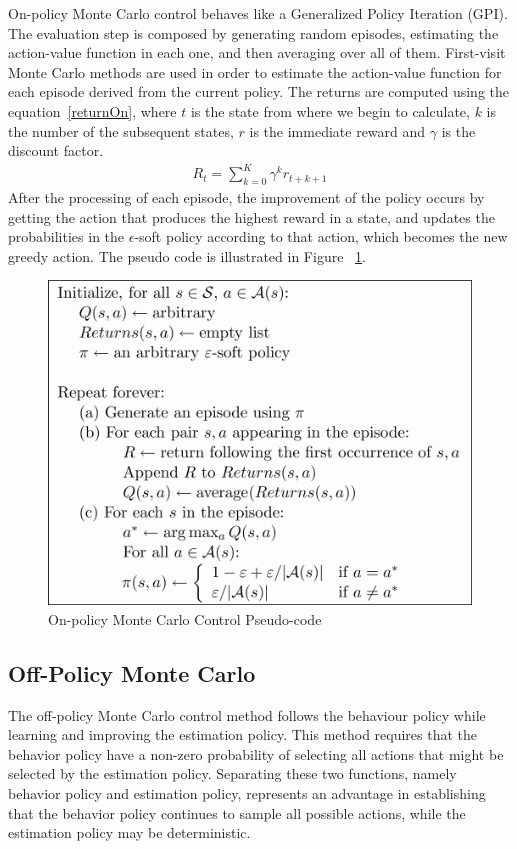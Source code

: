 \documentclass[paper=a4, fontsize=11pt]{scrartcl}
\numberwithin{equation}{section}		%
\numberwithin{figure}{section}			%
\numberwithin{table}{section}				%
\begin{document}
On-policy Monte Carlo control behaves like a Generalized Policy Iteration (GPI). The evaluation step is composed by generating random episodes, estimating the action-value function in each one, and then averaging over all of them. First-visit Monte Carlo methods are used in order to estimate the action-value function for each episode derived from the current policy. The returns are computed using the equation~\ref{returnOn}, where $t$ is the state from where we begin to calculate, $k$ is the number of the subsequent states, $r$ is the immediate reward and $\gamma$ is the discount factor.
\begin{align}
R_t = \sum_{k=0}^{K}\gamma^k r_{t+k+1} \label{returnOn}
\end{align}
After the processing of each episode, the improvement of the policy occurs by getting the action that produces the highest reward in a state, and updates the probabilities in the $\epsilon$-soft policy according to that action, which becomes the new greedy action. The pseudo code is illustrated in Figure ~\ref{onmc}.

\begin{figure}[ht] \centering
\includegraphics[scale=0.6]{pseudotmp5.pdf}
\caption{On-policy Monte Carlo Control Pseudo-code} \label{onmc}
\end{figure}

\subsection{\textbf {Off-Policy Monte Carlo}}
The off-policy Monte Carlo control method follows the behaviour policy while learning and improving the estimation policy. This method requires that the behavior policy have a non-zero probability of selecting all actions that might be selected by the estimation policy. Separating these two functions, namely behavior policy and estimation policy, represents an advantage in establishing that the behavior policy continues to sample all possible actions, while the estimation policy may be deterministic.
\end{document}
